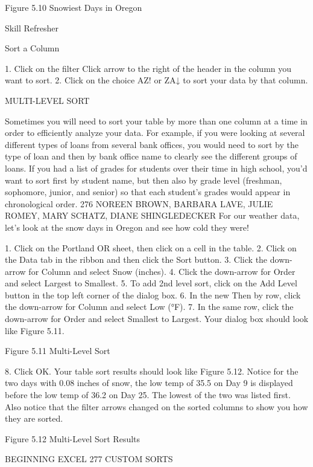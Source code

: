 Figure 5.10 Snowiest Days in Oregon


Skill Refresher


Sort a Column

1. Click on the filter Click arrow to the right of the header in the column you want to sort.
2. Click on the choice AZ! or ZA↓ to sort your data by that column.




MULTI-LEVEL SORT

Sometimes you will need to sort your table by more than one column at a time in order to efficiently
analyze your data. For example, if you were looking at several different types of loans from several
bank offices, you would need to sort by the type of loan and then by bank office name to clearly see
the different groups of loans. If you had a list of grades for students over their time in high school,
you’d want to sort first by student name, but then also by grade level (freshman, sophomore, junior,
and senior) so that each student’s grades would appear in chronological order.
276 NOREEN BROWN, BARBARA LAVE, JULIE ROMEY, MARY SCHATZ, DIANE SHINGLEDECKER
For our weather data, let’s look at the snow days in Oregon and see how cold they were!

1.   Click on the Portland OR sheet, then click on a cell in the table.
2.   Click on the Data tab in the ribbon and then click the Sort button.
3.   Click the down-arrow for Column and select Snow (inches).
4.   Click the down-arrow for Order and select Largest to Smallest.
5.   To add 2nd level sort, click on the Add Level button in the top left corner of the dialog box.
6.   In the new Then by row, click the down-arrow for Column and select Low (°F).
7.   In the same row, click the down-arrow for Order and select Smallest to Largest. Your dialog box
should look like Figure 5.11.




Figure 5.11 Multi-Level Sort


8. Click OK. Your table sort results should look like Figure 5.12. Notice for the two days with 0.08
inches of snow, the low temp of 35.5 on Day 9 is displayed before the low temp of 36.2 on Day
25. The lowest of the two was listed first. Also notice that the filter arrows changed on the
sorted columns to show you how they are sorted.




Figure 5.12 Multi-Level Sort Results


BEGINNING EXCEL 277
CUSTOM SORTS

